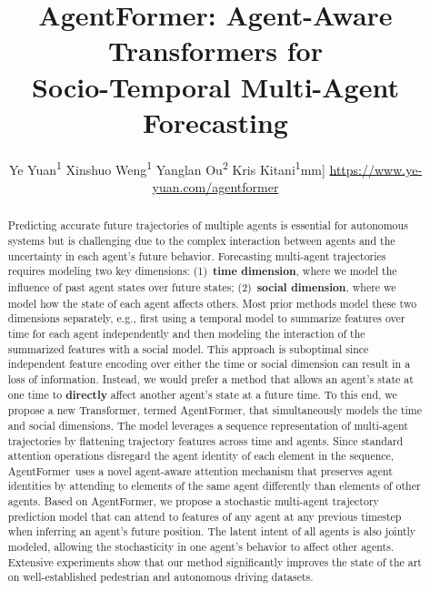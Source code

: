 \documentclass[10pt,twocolumn,letterpaper]{article}
\newcommand{\mname}{AgentFormer}
\begin{document}
\title{\mname: Agent-Aware Transformers for\\Socio-Temporal Multi-Agent Forecasting}

\author{
Ye Yuan\textsuperscript{1} \qquad Xinshuo Weng\textsuperscript{1} \qquad Yanglan Ou\textsuperscript{2} \qquad Kris Kitani\textsuperscript{1}\1mm]
{ \url{https://www.ye-yuan.com/agentformer}} \\
}

\maketitle
\ificcvfinal\thispagestyle{empty}\fi

\begin{abstract}
\vspace{-3mm}
    Predicting accurate future trajectories of multiple agents is essential for autonomous systems but is challenging due to the complex interaction between agents and the uncertainty in each agent's future behavior. Forecasting multi-agent trajectories requires modeling two key dimensions:
    (1)~\textbf{time dimension}, where we model the influence of past agent states over future states; (2)~\textbf{social dimension}, where we model how the state of each agent affects others.
    Most prior methods model these two dimensions separately, e.g., first using a temporal model to summarize features over time for each agent independently and then modeling the interaction of the summarized features with a social model. This approach is suboptimal since independent feature encoding over either the time or social dimension can result in a loss of information. Instead, we would prefer a method that allows an agent's state at one time to \textbf{directly} affect another agent's state at a future time.
    To this end, we propose a new Transformer, termed \mname, that simultaneously models the time and social dimensions. The model leverages a sequence representation of multi-agent trajectories by flattening trajectory features across time and agents. Since standard attention operations disregard the agent identity of each element in the sequence, \mname\ uses a novel agent-aware attention mechanism that preserves agent identities by attending to elements of the same agent differently than elements of other agents. Based on \mname, we propose a stochastic multi-agent trajectory prediction model that can attend to features of any agent at any previous timestep when inferring an agent's future position. The latent intent of all agents is also jointly modeled, allowing the stochasticity in one agent's behavior to affect other agents. Extensive experiments show that our method significantly improves the state of the art on well-established pedestrian and autonomous driving datasets.
\end{abstract}
\end{document}
